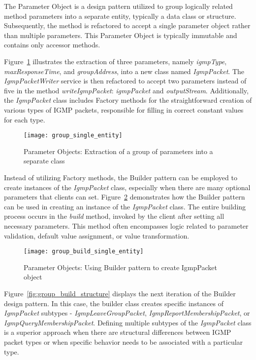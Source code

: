 The Parameter Object is a design pattern utilized to group logically related method parameters into a separate entity,
typically a data class or structure.
Subsequently, the method is refactored to accept a single parameter object rather than multiple parameters.
This Parameter Object is typically immutable and contains only accessor methods.

Figure~\ref{fig:group_single_entity} illustrates the extraction of three parameters, namely \textit{igmpType},
\textit{maxResponseTime}, and \textit{groupAddress}, into a new class named \textit{IgmpPacket}.
The \textit{IgmpPacketWriter} service is then refactored to accept two parameters instead of five in the method
\textit{writeIgmpPacket}: \textit{igmpPacket} and \textit{outputStream}.
Additionally, the \textit{IgmpPacket} class includes Factory methods for the straightforward creation of various types
of IGMP packets, responsible for filling in correct constant values for each type.

\begin{figure}[!htb]
    \centering
    \texttt{[image: group\_single\_entity]}
    \caption{Parameter Objects: Extraction of a group of parameters into a separate class}
    \label{fig:group_single_entity}
\end{figure}

Instead of utilizing Factory methods, the Builder pattern can be employed to create instances
of the \textit{IgmpPacket} class, especially when there are many optional parameters that clients can set.
Figure~\ref{fig:group_build_single_entity} demonstrates how the Builder pattern can be used in creating
an instance of the \textit{IgmpPacket} class.
The entire building process occurs in the \textit{build} method, invoked by the client after setting
all necessary parameters.
This method often encompasses logic related to parameter validation, default value assignment, or value transformation.

\begin{figure}[!htb]
    \centering
    \texttt{[image: group\_build\_single\_entity]}
    \caption{Parameter Objects: Using Builder pattern to create IgmpPacket object}
    \label{fig:group_build_single_entity}
\end{figure}

Figure~\ref{fig:group_build_structure} displays the next iteration of the Builder design pattern.
In this case, the builder class creates specific instances of \textit{IgmpPacket} subtypes -
\textit{IgmpLeaveGroupPacket}, \textit{IgmpReportMembershipPacket}, or \textit{IgmpQueryMembershipPacket}.
Defining multiple subtypes of the \textit{IgmpPacket} class is a superior approach when there are structural differences
between IGMP packet types or when specific behavior needs to be associated with a particular type.


